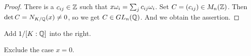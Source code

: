 


\begin{proof}
  There is a $c_{ij} \in {\mathbb Z}$ such that $x {\omega}_i = \sum_{j} c_{ij} {\omega}_i$. Set $C= (c_{ij}) \in M_n({\mathbb Z})$. Then $\det C = N_{K/{\mathbb Q}}(x) \neq 0 $, so we get $C \in GL_n({\mathbb Q})$. And we obtain the assertion.
\end{proof}

\begin{rem}
   Add $1/[K:{\mathbb Q}]$ into the right.
\end{rem}

\begin{rem}
   Exclude the case $x = 0$.
\end{rem}




